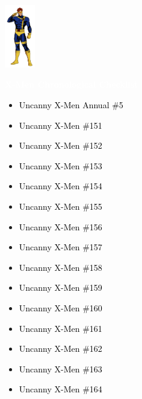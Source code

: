 \documentclass[12pt]{article}
\newcommand{\checkbox}{\raisebox{0.0ex}{\fbox{\rule{0ex}{1.5ex} \rule{1.5ex}{0ex}}}}
\begin{document}
\begin{center}
    \vspace*{2cm}
    \includegraphics[width=0.1\textwidth]{cyclops.png}
    \vspace{0.3cm}

    {\Huge \textbf{\textcolor{white}{X-Men Chronological Checklist}}}
\end{center}

\vspace{0.3cm}
\noindent
\begin{tcolorbox}[
  colback=white!95!gray,
  colframe=black,
  width=\textwidth,
  arc=4mm,
  auto outer arc,
  boxrule=0.8pt,
  left=8pt,right=8pt,top=8pt,bottom=8pt
]
\begin{itemize}[left=0pt,label={\checkbox}]
  \item \textcolor{black}{Uncanny X-Men Annual \#5}
  \item \textcolor{black}{Uncanny X-Men \#151}
  \item \textcolor{black}{Uncanny X-Men \#152}
  \item \textcolor{black}{Uncanny X-Men \#153}
  \item \textcolor{black}{Uncanny X-Men \#154}
  \item \textcolor{black}{Uncanny X-Men \#155}
  \item \textcolor{black}{Uncanny X-Men \#156}
  \item \textcolor{black}{Uncanny X-Men \#157}
  \item \textcolor{black}{Uncanny X-Men \#158}
  \item \textcolor{black}{Uncanny X-Men \#159}
  \item \textcolor{black}{Uncanny X-Men \#160}
  \item \textcolor{black}{Uncanny X-Men \#161}
  \item \textcolor{black}{Uncanny X-Men \#162}
  \item \textcolor{black}{Uncanny X-Men \#163}
  \item \textcolor{black}{Uncanny X-Men \#164}
\end{itemize}
\end{tcolorbox}
\end{document}
